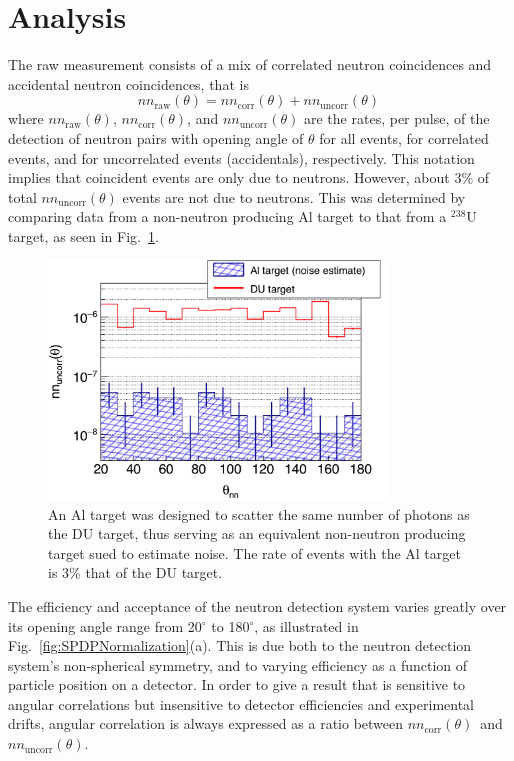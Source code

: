 \section{Analysis}
\label{Analysis}
The raw measurement consists of a mix of correlated neutron coincidences and accidental neutron coincidences, that is
\begin{equation}
\label{eq:corr_uncorr}
nn_{\text{raw}}(\theta)= nn_{\text{corr}}(\theta) + nn_{\text{uncorr}}(\theta) \,
\end{equation}
where $nn_{\text{raw}}(\theta)$,  $nn_{\text{corr}}(\theta)$, and $nn_{\text{uncorr}}(\theta)$ are the rates, per pulse, of the detection of neutron pairs with opening angle of $\theta$ for all events, for correlated events, and for uncorrelated events (accidentals), respectively.
This notation implies that coincident events are only due to neutrons.
However, about 3\% of total  $nn_{\text{uncorr}}(\theta)$ events are not due to neutrons.
This was determined by comparing data from a non-neutron producing Al target to that from a $^{238}$U target, as seen in Fig.~\ref{fig:Noise}.
\begin{figure}[]
\centering
    \includegraphics[width=0.8\textwidth]{Content/Methods/Noise.png}
    \caption{An Al target was designed to scatter the same number of photons as the DU target, thus serving as an equivalent non-neutron producing target sued to estimate noise.
    The rate of events with the Al target is 3\% that of the DU target. 
        }
    \label{fig:Noise}
\end{figure}

The efficiency and acceptance of the neutron detection system varies greatly over its opening angle range from 20$^{\circ}$ to 180$^{\circ}$, as illustrated in Fig.~\ref{fig:SPDPNormalization}(a).
This is due both to the neutron detection system's non-spherical symmetry, and to varying efficiency as a function of particle position on a detector.
In order to give a result that is sensitive to angular correlations but insensitive to detector efficiencies and experimental drifts, angular correlation is always expressed as a ratio between $nn_{\text{corr}}(\theta)$~and~$nn_{\text{uncorr}}(\theta)$.

